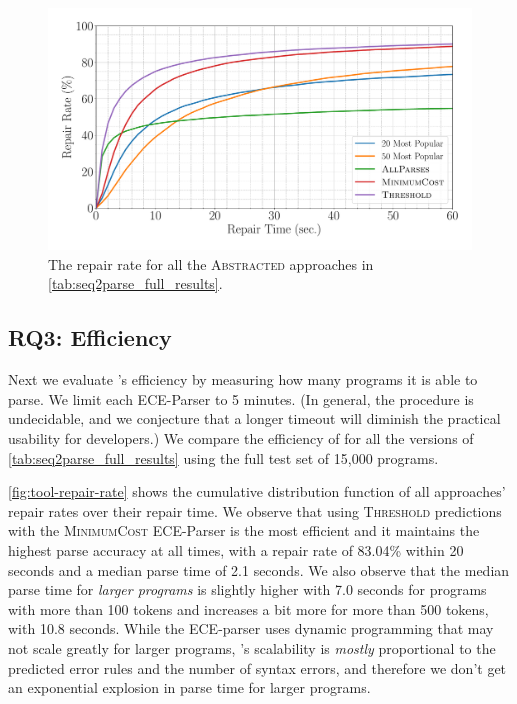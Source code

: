 \begin{figure}[t]
  \centering
  \includegraphics[width=0.85\linewidth]{tool-repair-rate.pdf}
  \caption{The repair rate for all the \textsc{Abstracted} approaches in
  \autoref{tab:seq2parse_full_results}.}
  \label{fig:tool-repair-rate}
\end{figure}

\subsection{RQ3: Efficiency}
\label{sec:eval:efficiency}

Next we evaluate \toolname's efficiency by measuring how many programs it is
able to parse. We limit each ECE-Parser to 5 minutes. (In general, the procedure
is undecidable, and we conjecture that a longer timeout will diminish the
practical usability for developers.) We compare the efficiency of \toolname for
all the versions of \autoref{tab:seq2parse_full_results} using the full test set
of 15,000 programs.

\autoref{fig:tool-repair-rate} shows the cumulative distribution function of all
\toolname approaches' repair rates over their repair time. We observe that using
\textsc{Threshold} predictions with the \textsc{MinimumCost} ECE-Parser is the
most efficient and it maintains the highest parse accuracy at all times, with a
repair rate of 83.04\% within 20 seconds and a median parse time of 2.1 seconds.
We also observe that the median parse time for \emph{larger programs} is
slightly higher with 7.0 seconds for programs with more than 100 tokens and
increases a bit more for more than 500 tokens, with 10.8 seconds. While the
ECE-parser uses dynamic programming that may not scale greatly for larger
programs, \toolname's scalability is \emph{mostly} proportional to the predicted
error rules and the number of syntax errors, and therefore we don't get an
exponential explosion in parse time for larger programs.

